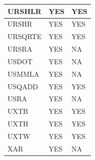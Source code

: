 \begin{longtable}{|l|l|l|}
\hline
URSHLR & YES & YES\\
\hline
URSHR & YES & YES\\
\hline
URSQRTE & YES & YES\\
\hline
URSRA & YES & NA\\
\hline
USDOT & YES & NA\\
\hline
USMMLA & YES & NA\\
\hline
USQADD & YES & YES\\
\hline
USRA & YES & NA\\
\hline
UXTB & YES & YES\\
\hline
UXTH & YES & YES\\
\hline
UXTW & YES & YES\\
\hline
XAR & YES & NA\\
\hline
\end{longtable}
